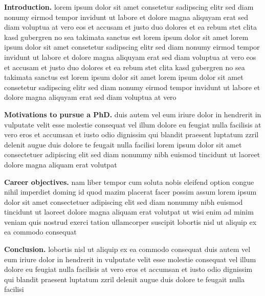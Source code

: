 \documentclass[11pt,letterpaper]{journal}
\title{\vspace*{-15mm}\mytitle\vspace*{-7mm}}\author{\me}\date{\today}
\begin{document}
{\bf Introduction.}
lorem ipsum dolor sit amet consetetur sadipscing elitr sed diam nonumy
eirmod tempor invidunt ut labore et dolore magna aliquyam erat sed diam
voluptua at vero eos et accusam et justo duo dolores et ea rebum stet clita
kasd gubergren no sea takimata sanctus est lorem ipsum dolor sit amet lorem
ipsum dolor sit amet consetetur sadipscing elitr sed diam nonumy eirmod
tempor invidunt ut labore et dolore\cite{amos2013applying}
magna aliquyam erat sed diam voluptua at
vero eos et accusam et justo duo dolores et ea rebum stet clita kasd
gubergren no sea takimata sanctus est lorem ipsum dolor sit amet lorem ipsum
dolor sit amet consetetur sadipscing elitr sed diam nonumy eirmod tempor
invidunt ut labore et dolore magna aliquyam erat sed diam voluptua at vero

{\bf Motivations to pursue a PhD.}
duis autem vel eum iriure dolor in hendrerit in vulputate velit esse
molestie consequat vel illum dolore eu feugiat nulla facilisis at vero eros
et accumsan et iusto odio dignissim qui blandit praesent luptatum zzril
delenit augue duis dolore te feugait nulla facilisi lorem ipsum dolor sit
amet consectetuer adipiscing elit sed diam nonummy nibh euismod tincidunt ut
laoreet dolore magna aliquam erat volutpat

{\bf Career objectives.}
nam liber tempor cum soluta nobis eleifend option congue nihil imperdiet
doming id quod mazim placerat facer possim assum lorem ipsum dolor sit amet
consectetuer adipiscing elit sed diam nonummy nibh euismod tincidunt ut
laoreet dolore magna aliquam erat volutpat ut wisi enim ad minim veniam quis
nostrud exerci tation ullamcorper suscipit lobortis nisl ut aliquip ex ea
commodo consequat

{\bf Conclusion.}
lobortis nisl ut aliquip ex ea commodo consequat duis autem vel eum iriure
dolor in hendrerit in vulputate velit esse molestie consequat vel illum
dolore eu feugiat nulla facilisis at vero eros et accumsan et iusto odio
dignissim qui blandit praesent luptatum zzril delenit augue duis dolore te
feugait nulla facilisi

\vspace*{-9mm}
{\small
\renewcommand{\refname}{}


}
\end{document}
